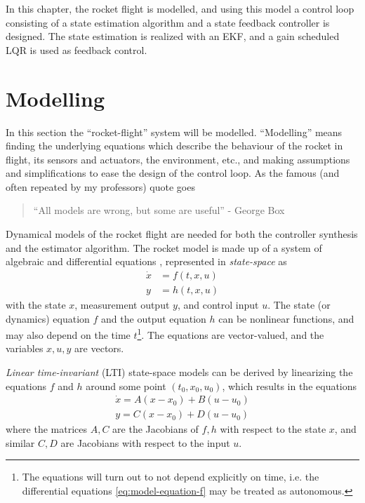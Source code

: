 In this chapter, the rocket flight is modelled, and using this model a control loop consisting of a state estimation algorithm and a state feedback controller is designed.
The state estimation is realized with an EKF, and a gain scheduled LQR is used as feedback control.

\section{Modelling}
In this section the ``rocket-flight'' system will be modelled.
``Modelling'' means finding the underlying equations which describe the behaviour of the rocket in flight, its sensors and actuators, the environment, etc., and making assumptions and simplifications to ease the design of the control loop.
As the famous (and often repeated by my professors) quote goes
\begin{quote}
``All models are wrong, but some are useful'' - George Box
\end{quote}

Dynamical models of the rocket flight are needed for both the controller synthesis and the estimator algorithm.  
The rocket model is made up of a system of algebraic and differential equations \cite{zipfel2007, lewis2008, stevens2015}, represented in \textit{state-space} as \cite{lewis2008, stevens2015}
\begin{align}
    \dot x &= f(t, x, u) \label{eq:model-equation-f}  \\  
    y &= h(t, x, u) \label{eq:model-equation-h}
\end{align}  
with the state $x$, measurement output $y$, and control input $u$.
The state (or dynamics) equation $f$ and the output equation $h$ can be nonlinear functions, and may also depend on the time $t$\footnote{The equations will turn out to not depend explicitly on time, i.e. the differential equations \ref{eq:model-equation-f} may be treated as autonomous.}.
The equations are vector-valued, and the variables $x,u,y$ are vectors.

\textit{Linear time-invariant} (LTI) state-space models can be derived by linearizing the equations $f$ and $h$ around some point $(t_0, x_0, u_0)$, which results in the equations
\begin{align}
    \dot x = A (x-x_0) + B (u-u_0) \label{eq:model-linear-state} \\
    y = C (x-x_0) + D (u-u_0) \label{eq:model-linear-meas}
\end{align}
where the matrices $A,C$ are the Jacobians of $f,h$ with respect to the state $x$, and similar $C,D$ are Jacobians with respect to the input $u$.

